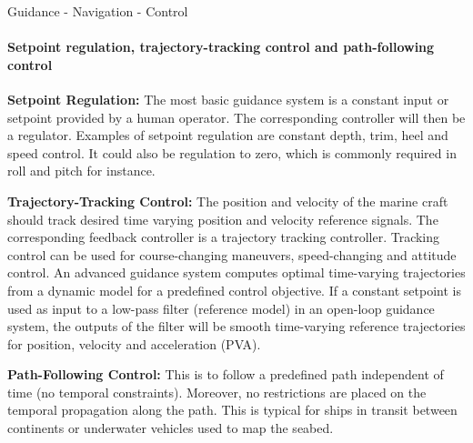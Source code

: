 \begin{frame}{Guidance - Navigation - Control}
	\framesubtitle{Setpoint regulation, trajectory-tracking control and path-following control}
	\textbf{Setpoint Regulation:} The most basic guidance system is {\color{red}a constant input or setpoint provided by a human operator}. The corresponding controller will then be a regulator. Examples of setpoint regulation are constant depth, trim, heel and speed control. It could also be regulation to zero, which is commonly required in roll and pitch for instance.
	
	\textbf{Trajectory-Tracking Control:} The position and velocity of the marine craft should {\color{red}track desired time varying position and velocity reference signals}. The corresponding feedback controller is a trajectory tracking controller. Tracking control can be used for course-changing maneuvers, speed-changing and attitude control. An advanced guidance system computes optimal time-varying trajectories from a dynamic model for a predefined control objective. If a constant setpoint is used as input to a low-pass filter (reference model) in an open-loop guidance system, the outputs of the filter will be smooth time-varying reference trajectories for position, velocity and acceleration (PVA).
	
	\textbf{Path-Following Control:} This is to {\color{red} follow a predefined path independent of time} (no temporal constraints). Moreover, no restrictions are placed on the temporal propagation along the path. This is typical for ships in transit between continents or underwater vehicles used to map the seabed.
\end{frame}







